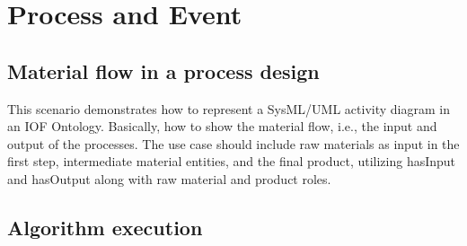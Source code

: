 \chapter{Process and Event}



\section*{Material flow in a process design}
This scenario demonstrates how to represent a SysML/UML activity diagram in an IOF Ontology.
Basically, how to show the material flow, i.e., the input and output of the processes.
The use case should include raw materials as input in the first step, intermediate material entities, and the final product, utilizing hasInput and hasOutput along with raw material and product roles.



\section{Algorithm execution}
\label{sec-algorithm-execution}

